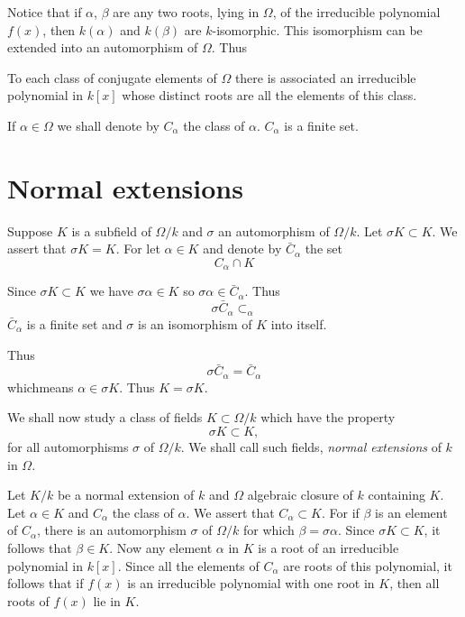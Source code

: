   Notice that  if $ \alpha$, $\beta$ are any two roots, lying in
  $\Omega$,  of the irreducible polynomial $ f (x) $, then $ k (
  \alpha) $ and  $k (\beta) $ are $k$-isomorphic. This isomorphism can
  be extended into  an automorphism of $\Omega$. Thus 

\setcounter{thm}{0}
\begin{thm}\label{c2:thm1}%
To each class of conjugate elements of $ \Omega$  there is
   associated an irreducible polynomial in $ k [ x ] $ whose distinct
   roots are all the elements of this class. 
\end{thm}  
  
If $ \alpha \in  \Omega$ we shall denote by $C_\alpha$ the class of
$\alpha $. $ C_\alpha$ is  a finite set. 
  

\section{Normal extensions}\label{c2:s2}%

Suppose $K$ is a  subfield of $ \Omega / k $ and $ \sigma $ an
automorphism of $ \Omega / k $. Let $ \sigma K \subset K$. We assert
that $\sigma K = K $. For let  $\alpha \in K$ and denote by
$\bar{C}_\alpha$ the set  
$$
C_\alpha \cap K 
$$

Since $ \sigma K \subset K $ we have $ \sigma \alpha \in K$ so
$\sigma \alpha \in \bar{C}_\alpha$. Thus  
$$
\sigma \bar{C}_\alpha \subset_\alpha
$$
$ \bar{C}_\alpha$ is  a finite set and $ \sigma $ is an isomorphism
of $ K $ into itself.  

Thus
$$
\sigma \bar{C}_\alpha = \bar{C}_\alpha
$$ 
which\pageoriginale means $ \alpha \in  \sigma K $. Thus $ K = \sigma K$.

We shall now study a class of fields $ K \subset  \Omega / k $ which
have the property  
$$
 \sigma K \subset K,
$$
for all automorphisms $ \sigma$ of $ \Omega /k $. We shall call such
fields, \textit{normal extensions} of  $ k $  in $\Omega $. 

 Let $ K/k $  be a normal extension of $k$ and  $ \Omega$ algebraic
 closure of $k$ containing $K$. Let $ \alpha \in K $  and $ C_\alpha
 $ the class of $ \alpha $. We assert that $ C_\alpha \subset K
 $. For if  $ \beta $ is an element of $ C_\alpha $, there is an
 automorphism $ \sigma $ of  $\Omega / k $ for which $ \beta  =
 \sigma \alpha $. Since $ \sigma K \subset K $, it follows that $
 \beta  \in K $. Now any element $ \alpha $  in $K$  is a root of an
 irreducible polynomial in $ k [ x ] $. Since all the elements of $
 C_\alpha $ are roots  of this polynomial, it follows that if $ f(x)$
 is an  irreducible polynomial with one root in $K$, then all roots 
 of $ f (x) $  lie in $K$. 
 
